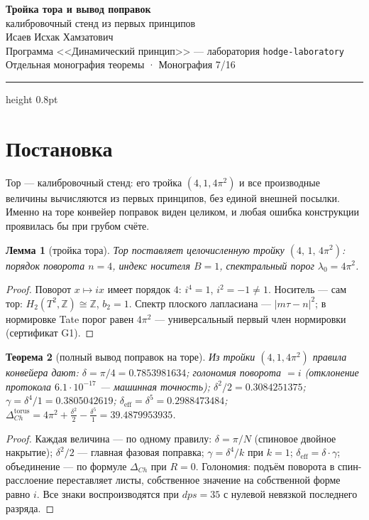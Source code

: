 \documentclass[11pt,a4paper]{article}
\theoremstyle{plain}
\newtheorem{theorem}{Теорема}
\newtheorem{lemma}[theorem]{Лемма}
\theoremstyle{definition}
\theoremstyle{remark}
\newcommand{\ZZ}{\mathbb{Z}}
\begin{document}
\begin{center}
{\LARGE\bfseries Тройка тора и вывод поправок}\\[0.4em]
{\large калибровочный стенд из первых принципов}\\[0.6em]
{\normalsize Исаев Исхак Хамзатович}\\[0.2em]
{\small Программа <<Динамический принцип>> --- лаборатория \texttt{hodge-laboratory}}\\[0.15em]
{\small Отдельная монография теоремы · Монография 7/16}
\end{center}
\vspace{0.4em}
{\color{linkblue}\hrule height 0.8pt}
\vspace{0.8em}

\section{Постановка}

Тор --- калибровочный стенд: его тройка $(4,1,4\pi^2)$ и все
производные величины вычисляются из первых принципов, без единой
внешней посылки. Именно на торе конвейер поправок виден целиком, и
любая ошибка конструкции проявилась бы при грубом счёте.

\begin{lemma}[тройка тора]\label{lem:torus}
Тор поставляет целочисленную тройку $(4,\,1,\,4\pi^2)$: порядок
поворота $n=4$, индекс носителя $B=1$, спектральный порог
$\lambda_0=4\pi^2$.
\end{lemma}

\begin{proof}
Поворот $x\mapsto ix$ имеет порядок $4$: $i^4=1$, $i^2=-1\ne1$.
Носитель --- сам тор: $H_2(T^2,\ZZ)\cong\ZZ$, $b_2=1$. Спектр
плоского лапласиана --- $|m\tau-n|^2$; в нормировке Tate порог
равен $4\pi^2$ --- универсальный первый член нормировки
(сертификат G1).
\end{proof}

\begin{theorem}[полный вывод поправок на торе]\label{th:toruscorr}
Из тройки $(4,1,4\pi^2)$ правила конвейера дают:
$\delta=\pi/4=0.7853981634$; голономия поворота $=i$ (отклонение
протокола $6.1\cdot10^{-17}$ --- машинная точность);
$\delta^2/2=0.3084251375$; $\gamma=\delta^4/1=0.3805042619$;
$\delta_{\mathrm{eff}}=\delta^5=0.2988473484$;
$\Delta_{Ch}^{\mathrm{torus}}=4\pi^2+\frac{\delta^2}2-\frac{\delta^5}1
=39.4879953935$.
\end{theorem}

\begin{proof}
Каждая величина --- по одному правилу: $\delta=\pi/N$
(спиновое двойное накрытие); $\delta^2/2$ --- главная фазовая
поправка; $\gamma=\delta^4/k$ при $k=1$; $\delta_{\mathrm{eff}}
=\delta\cdot\gamma$; объединение --- по формуле $\Delta_{Ch}$ при
$R=0$. Голономия: подъём поворота в спин-расслоение переставляет
листы, собственное значение на собственной форме равно $i$.
Все знаки воспроизводятся при $dps=35$ с нулевой невязкой
последнего разряда.
\end{proof}
\end{document}
